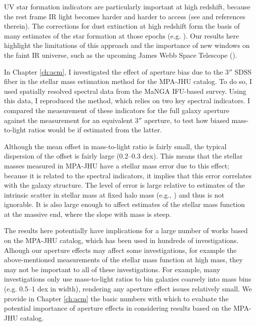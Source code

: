 UV star formation indicators are particularly important
at high redshift, because the rest frame IR light becomes
harder and harder to access (see \citealt{madau_cosmic_2014} and 
references therein). The corrections for dust extinction
at high redshift form the basis of many estimates of the
star formation at those epochs (e.g. \citealt{overzier11a}). 
Our results here highlight the limitations of this approach
and the importance of new windows on the faint IR universe,
such as the upcoming James Webb Space Telescope 
(\citealt{gardner06a}).

In Chapter \ref{ch:acm}, I investigated the effect of 
aperture bias due to the 3$''$ SDSS fiber in the stellar 
mass estimation method for the MPA-JHU catalog. To do so,
I used spatially resolved spectral data from the MaNGA 
IFU-based survey. Using this data, I reproduced the 
\citet{kauffmann_stellar_2003} method, which relies on two 
key spectral indicators. I compared the measurement
of these indicators for the full galaxy aperture against 
the measurement for an equivalent 3$''$ aperture, to 
test how biased mass-to-light ratios would be if
estimated from the latter.

Although the mean offset in mass-to-light ratio
is fairly small, the typical dispersion of the offset
is fairly large (0.2--0.3 dex). This means that the 
stellar masses measured in MPA-JHU have a stellar mass
error due to this effect; because it is related to 
the spectral indicators, it implies that this error 
correlates with the galaxy structure. The level of 
error is large relative to estimates of the intrinsic
scatter in stellar mass at fixed halo mass (e.g., 
\citealt{tinker17a}) and thus is not ignorable. It is 
also large enough to affect estimates of the stellar
mass function at the massive end, where the slope with
mass is steep.

The results here potentially have implications for 
a large number of works based on the MPA-JHU catalog,
which has been used in hundreds of investigations.
Alhough our aperture effects may affect some investigations,
for example the above-mentioned measurements of the 
stellar mass function at high mass,
they may not  be important to all of these investigations. 
For example, many investigations only use mass-to-light
ratios to bin galaxies coarsely into mass bins
(e.g. 0.5--1 dex in width), rendering
any aperture effect issues relatively small.
We provide in  Chapter \ref{ch:acm} the basic numbers 
with which to evaluate the potential importance of 
aperture effects in considering results based on the 
MPA-JHU catalog.

